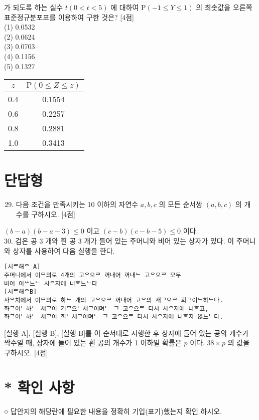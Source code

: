 \documentclass[10pt]{article}
\begin{document}
가 되도록 하는 실수 $t(0<t<5)$ 에 대하여 $\mathrm{P}(-1 \leq Y \leq 1)$ 의 최솟값을 오른쪽 표준정규분포표를 이용하여 구한 것은? [4점]\\
(1) 0.0532\\
(2) 0.0624\\
(3) 0.0703\\
(4) 0.1156\\
(5) 0.1327

\begin{center}
\begin{tabular}{|c|c|}
\hline
$z$ & $\mathrm{P}(0 \leq Z \leq z)$ \\
\hline
0.4 & 0.1554 \\
\hline
0.6 & 0.2257 \\
\hline
0.8 & 0.2881 \\
\hline
1.0 & 0.3413 \\
\hline
\end{tabular}
\end{center}

\section*{단답형}
\begin{enumerate}
  \setcounter{enumi}{28}
  \item 다음 조건을 만족시키는 10 이하의 자연수 $a, b, c$ 의 모든 순서쌍 $(a, b, c)$ 의 개수를 구하시오. [4점]
\end{enumerate}

$(b-a)(b-a-3) \leq 0$ 이고 $(c-b)(c-b-5) \leq 0$ 이다.\\
30. 검은 공 3 개와 흰 공 3 개가 들어 있는 주머니와 비어 있는 상자가 있다. 이 주머니와 상자를 사용하여 다음 실행을 한다.

\begin{verbatim}
[시ᄅ해ᄋ A]
주머니에서 이ᄆ의로 4개의 고ᄋ으ᄅ 꺼내어 꺼내ᄂ 고ᄋ으ᄅ 모두
비어 이ᄊ느ᄂ 사ᄋ자에 너ᄒ느ᄂ다
[시ᄅ해ᄋB]
사ᄋ차에서 이ᄆ의로 하ᄂ 개의 고ᄋ으ᄅ 꺼내어 고ᄋ의 새ᄀ으ᄅ 화ᄀ이ᄂ하ᄂ다.
화ᄀ이ᄂ하ᄂ 새ᄀ이 거ᄆ으ᄂ새ᄀ이며ᄂ 그 고ᄋ으ᄅ 다시 사ᄋ자에 너ᄒ고,
화ᄀ이ᄂ하ᄂ 새ᄀ이 희ᄂ새ᄀ이며ᄂ 그 고ᄋ으ᄅ 다시 사ᄋ자에 너ᄒ지 않느ᄂ다.
\end{verbatim}

[실행 A], [실행 B], [실행 B]를 이 순서대로 시행한 후 상자에 들어 있는 공의 개수가 짝수일 때, 상자에 들어 있는 흰 공의 개수가 1 이하일 확률은 $p$ 이다. $38 \times p$ 의 값을 구하시오. [4점]

\section*{* 확인 사항}
○ 답안지의 해당란에 필요한 내용을 정확히 기입(표기)했는지 확인 하시오.
\end{document}
